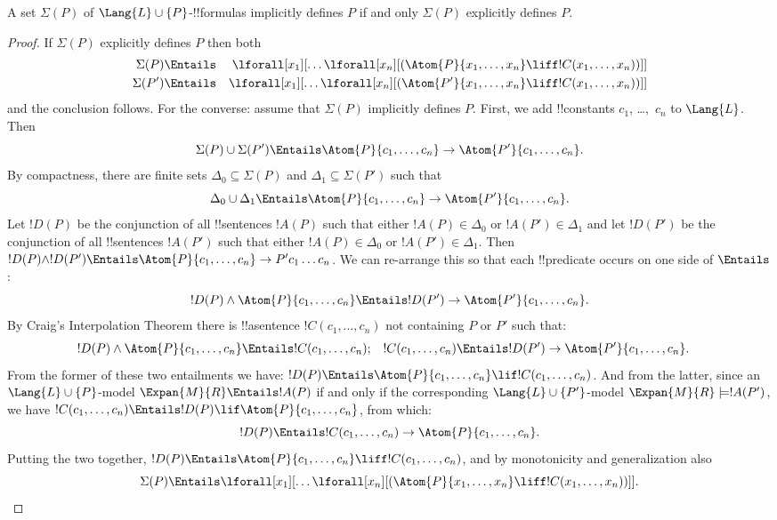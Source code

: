 \documentclass[../../../include/open-logic-section]{subfiles}
\begin{document}
\begin{thm} A set $\Sigma(P)$ of $\Lang{L}
  \cup\{P\}$-!!{formula}s implicitly defines $P$ if and only $\Sigma(P)$
  explicitly defines $P$.
\end{thm}

\begin{proof}
If $\Sigma(P)$ explicitly defines $P$ then both
\begin{align*}
  \Sigma(P) & \Entails & \lforall[x_1][\dots \lforall[x_n]
    [(\Atom{P}{x_1,\dots, x_n} \liff !C(x_1,\dots,x_n))]]\\
  \Sigma(P') & \Entails & \lforall[x_1][\dots \lforall[x_n]
    [(\Atom{P'}{x_1,\dots, x_n} \liff !C(x_1,\dots,x_n))]]
\end{align*}
and the conclusion follows. For the converse: assume that $\Sigma(P)$
implicitly defines $P$. First, we add !!{constant}s $c_1$, \dots,~$c_n$ to
$\Lang{L}$. Then
\[
\Sigma(P) \cup \Sigma(P') \Entails
\Atom{P}{c_1, \dots, c_n} \to  \Atom{P'}{c_1, \dots, c_n}.
\]
By compactness, there are finite sets $\Delta_0 \subseteq \Sigma(P)$
and $\Delta_1 \subseteq \Sigma(P')$ such that
\[
\Delta_0 \cup \Delta_1 \Entails
\Atom{P}{c_1, \dots, c_n} \to \Atom{P'}{c_1, \dots, c_n}.
\]
Let $!D(P)$ be the conjunction of all !!{sentence}s $!A(P)$ such that
either $!A(P) \in \Delta_0$ or $!A(P') \in \Delta_1$ and let $!D(P')$
be the conjunction of all !!{sentence}s $!A(P')$ such that either
$!A(P) \in \Delta_0$ or $!A(P') \in \Delta_1$. Then $!D(P) \land
!D(P') \Entails \Atom{P}{c_1, \dots, c_n} \to P'c_1\dots c_n$. We can
re-arrange this so that each !!{predicate} occurs on one side of
$\Entails$:
\[
!D(P) \land \Atom{P}{c_1, \dots, c_n} \Entails
!D(P') \to \Atom{P'}{c_1, \dots, c_n}.
\]
By Craig's Interpolation Theorem there is !!a{sentence} $!C(c_1,\dots, c_n)$
not containing $P$ or $P'$ such that:
\begin{align*}
  !D(P) \land \Atom{P}{c_1, \dots, c_n} & \Entails !C(c_1,\dots, c_n); &
  !C(c_1,\dots, c_n) & \Entails !D(P') \to \Atom{P'}{c_1, \dots, c_n}.
\end{align*}
From the former of these two entailments we have: $!D(P) \Entails
\Atom{P}{c_1,\dots, c_n} \lif !C(c_1,\dots, c_n)$. And from the
latter, since an $\Lang{L} \cup \{P\}$-model $\Expan{M}{R}
\Entails !A(P)$ if and only if the corresponding $\Lang{L} \cup
\{P'\}$-model $\Expan{M}{R} \models !A(P')$, we have
$!C(c_1,\dots, c_n) \Entails !D(P) \lif \Atom{P}{c_1,\dots, c_n}$,
from which:
\[
!D(P) \Entails !C(c_1,\dots,c_n) \to \Atom{P}{c_1,\dots, c_n}.
\]
Putting the two together, $!D(P) \Entails \Atom{P}{c_1,\dots, c_n}
\liff !C(c_1, \dots, c_n)$, and by monotonicity and generalization also
\[
\Sigma(P) \Entails
\lforall[x_1][\dots\lforall[x_n][(\Atom{P}{x_1,\dots, x_n} \liff
    !C(x_1,\dots, x_n))]].
\]
\end{proof}
\end{document}
